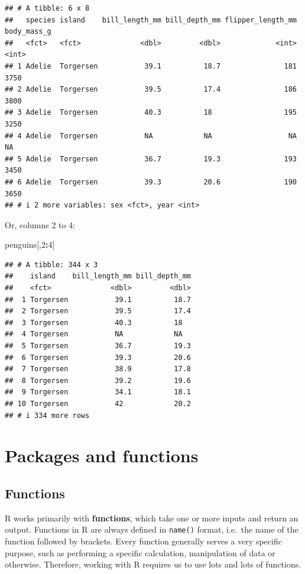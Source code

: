 \documentclass[
]{book}
\newenvironment{Shaded}{\begin{snugshade}}{\end{snugshade}}
\newcommand{\DecValTok}[1]{\textcolor[rgb]{0.00,0.00,0.81}{#1}}
\newcommand{\NormalTok}[1]{#1}
\newcommand{\SpecialCharTok}[1]{\textcolor[rgb]{0.81,0.36,0.00}{\textbf{#1}}}
\begin{document}
\begin{verbatim}
## # A tibble: 6 x 8
##   species island    bill_length_mm bill_depth_mm flipper_length_mm body_mass_g
##   <fct>   <fct>              <dbl>         <dbl>             <int>       <int>
## 1 Adelie  Torgersen           39.1          18.7               181        3750
## 2 Adelie  Torgersen           39.5          17.4               186        3800
## 3 Adelie  Torgersen           40.3          18                 195        3250
## 4 Adelie  Torgersen           NA            NA                  NA          NA
## 5 Adelie  Torgersen           36.7          19.3               193        3450
## 6 Adelie  Torgersen           39.3          20.6               190        3650
## # i 2 more variables: sex <fct>, year <int>
\end{verbatim}

Or, columns 2 to 4:

\begin{Shaded}
\begin{Highlighting}[]
\NormalTok{penguins[,}\DecValTok{2}\SpecialCharTok{:}\DecValTok{4}\NormalTok{]}
\end{Highlighting}
\end{Shaded}

\begin{verbatim}
## # A tibble: 344 x 3
##    island    bill_length_mm bill_depth_mm
##    <fct>              <dbl>         <dbl>
##  1 Torgersen           39.1          18.7
##  2 Torgersen           39.5          17.4
##  3 Torgersen           40.3          18  
##  4 Torgersen           NA            NA  
##  5 Torgersen           36.7          19.3
##  6 Torgersen           39.3          20.6
##  7 Torgersen           38.9          17.8
##  8 Torgersen           39.2          19.6
##  9 Torgersen           34.1          18.1
## 10 Torgersen           42            20.2
## # i 334 more rows
\end{verbatim}

\hypertarget{packages-and-functions}{%
\section{Packages and functions}\label{packages-and-functions}}

\hypertarget{functions}{%
\subsection{Functions}\label{functions}}

R works primarily with \textbf{functions}, which take one or more inputs and return an output. Functions in R are always defined in \texttt{name()} format, i.e.~the name of the function followed by brackets. Every function generally serves a very specific purpose, such as performing a specific calculation, manipulation of data or otherwise. Therefore, working with R requires us to use lots and lots of functions.
\end{document}
